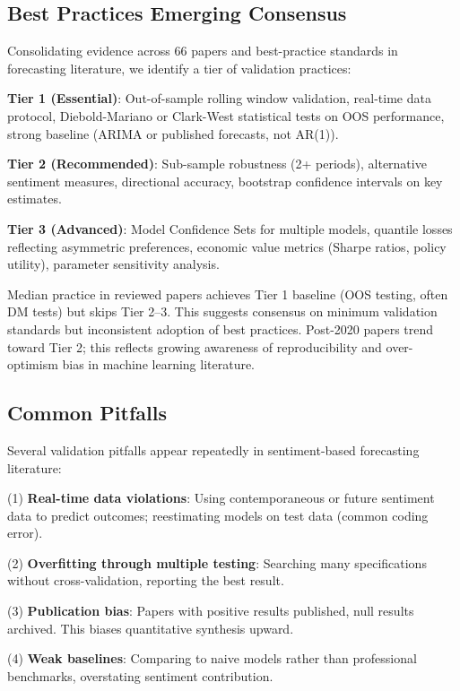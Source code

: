 \documentclass[11pt,twocolumn]{article}
\begin{document}
\subsection{Best Practices Emerging Consensus}

Consolidating evidence across 66 papers and best-practice standards in forecasting literature, we identify a tier of validation practices:

\textbf{Tier 1 (Essential)}: Out-of-sample rolling window validation, real-time data protocol, Diebold-Mariano or Clark-West statistical tests on OOS performance, strong baseline (ARIMA or published forecasts, not AR(1)).

\textbf{Tier 2 (Recommended)}: Sub-sample robustness (2+ periods), alternative sentiment measures, directional accuracy, bootstrap confidence intervals on key estimates.

\textbf{Tier 3 (Advanced)}: Model Confidence Sets for multiple models, quantile losses reflecting asymmetric preferences, economic value metrics (Sharpe ratios, policy utility), parameter sensitivity analysis.

Median practice in reviewed papers achieves Tier 1 baseline (OOS testing, often DM tests) but skips Tier 2--3. This suggests consensus on minimum validation standards but inconsistent adoption of best practices. Post-2020 papers trend toward Tier 2; this reflects growing awareness of reproducibility and over-optimism bias in machine learning literature.

\subsection{Common Pitfalls}

Several validation pitfalls appear repeatedly in sentiment-based forecasting literature:

\noindent
(1) \textbf{Real-time data violations}: Using contemporaneous or future sentiment data to predict outcomes; reestimating models on test data (common coding error). 

\noindent
(2) \textbf{Overfitting through multiple testing}: Searching many specifications without cross-validation, reporting the best result.

\noindent
(3) \textbf{Publication bias}: Papers with positive results published, null results archived. This biases quantitative synthesis upward.

\noindent
(4) \textbf{Weak baselines}: Comparing to naive models rather than professional benchmarks, overstating sentiment contribution.
\end{document}

